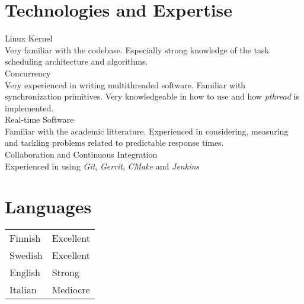 \documentclass[12pt]{article}
\begin{document}

\section*{Technologies and Expertise}

\large{Linux Kernel}\\
\normalsize{Very familiar with the codebase. Especially strong knowledge of the
task scheduling architecture and algorithms.}\\

\large{Concurrency}\\
\normalsize{Very experienced in writing multithreaded software. Familiar with
synchronization primitives. Very knowledgeable in how to use and how
\emph{pthread} is implemented.}\\

\large{Real-time Software}\\
\normalsize{Familiar with the academic litterature. Experienced in considering,
measuring and tackling problems related to predictable response times.}\\

\large{Collaboration and Continuous Integration}\\
\normalsize{Experienced in using \emph{Git}, \emph{Gerrit}, \emph{CMake} and
\emph{Jenkins}}


\section*{Languages}
\begin{tabular}{ll}
Finnish & Excellent\\
Swedish & Excellent\\
English & Strong\\
Italian & Mediocre\\
\end{tabular}
\end{document}
